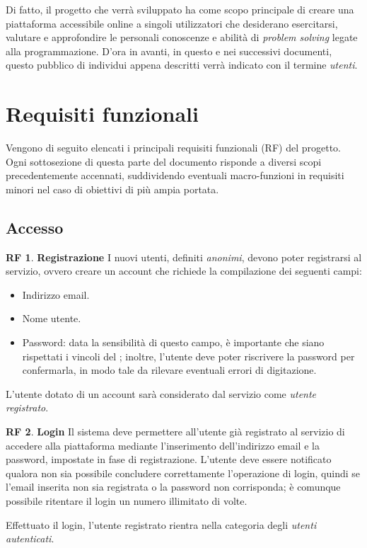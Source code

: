 \documentclass[11pt, a4paper]{article}
\theoremstyle{definition}
\newtheorem{funcreq}{RF} %
\begin{document}
Di fatto, il progetto che verrà sviluppato ha come scopo principale di
creare una piattaforma accessibile online a singoli utilizzatori che
desiderano esercitarsi, valutare e approfondire le personali
conoscenze e abilità di \textit{problem solving} legate alla programmazione.
D'ora in avanti, in questo e nei successivi documenti, questo pubblico di
individui appena descritti verrà indicato con il termine \textit{utenti}.

\newpage
\section{Requisiti funzionali}
Vengono di seguito elencati i principali requisiti funzionali (RF)
del progetto. Ogni sottosezione di questa parte del documento
risponde a diversi scopi precedentemente accennati, suddividendo
eventuali macro-funzioni in requisiti minori nel caso di obiettivi
di più ampia portata.

\subsection{Accesso}

\begin{funcreq}
\label{signup}
\textbf{Registrazione }
I nuovi utenti, definiti \textit{anonimi}, devono poter registrarsi al
servizio, ovvero creare un account che richiede la compilazione dei seguenti
campi:
\begin{itemize}
    \item Indirizzo email.
    \item Nome utente.
    \item Password: data la sensibilità di questo campo, è importante
    che siano rispettati i vincoli del ;
    inoltre, l'utente deve poter riscrivere la password per confermarla, in
    modo tale da rilevare eventuali errori di digitazione.
\end{itemize}
L'utente dotato di un account sarà considerato dal servizio come \textit{utente
registrato}.
\end{funcreq}

\begin{funcreq}
\label{login}
\textbf{Login }
Il sistema deve permettere all'utente già registrato al servizio di
accedere alla piattaforma mediante l'inserimento dell'indirizzo
email e la password, impostate in fase di registrazione. L'utente deve
essere notificato qualora non sia possibile concludere correttamente
l'operazione di login, quindi se l'email inserita non sia registrata o
la password non corrisponda; è comunque possibile ritentare il login un
numero illimitato di volte.

Effettuato il login, l'utente registrato rientra nella categoria degli
\textit{utenti autenticati}.
\end{funcreq}
\end{document}
